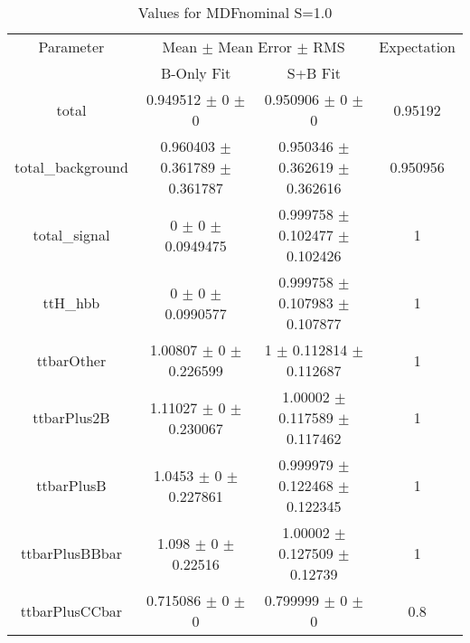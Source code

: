 \begin{table}
\centering
\caption{Values for MDFnominal S=1.0}
\begin{tabular}{cccc}
\toprule
Parameter & \multicolumn{2}{c}{Mean $\pm$ Mean Error $\pm$ RMS} & Expectation\\
 & B-Only Fit & S+B Fit & \\
\midrule
total & \num{0.949512} $\pm$ \num{0} $\pm$ \num{0} & \num{0.950906} $\pm$ \num{0} $\pm$ \num{0} & \num{0.95192}\\
total\_background & \num{0.960403} $\pm$ \num{0.361789} $\pm$ \num{0.361787} & \num{0.950346} $\pm$ \num{0.362619} $\pm$ \num{0.362616} & \num{0.950956}\\
total\_signal & \num{0} $\pm$ \num{0} $\pm$ \num{0.0949475} & \num{0.999758} $\pm$ \num{0.102477} $\pm$ \num{0.102426} & \num{1}\\
ttH\_hbb & \num{0} $\pm$ \num{0} $\pm$ \num{0.0990577} & \num{0.999758} $\pm$ \num{0.107983} $\pm$ \num{0.107877} & \num{1}\\
ttbarOther & \num{1.00807} $\pm$ \num{0} $\pm$ \num{0.226599} & \num{1} $\pm$ \num{0.112814} $\pm$ \num{0.112687} & \num{1}\\
ttbarPlus2B & \num{1.11027} $\pm$ \num{0} $\pm$ \num{0.230067} & \num{1.00002} $\pm$ \num{0.117589} $\pm$ \num{0.117462} & \num{1}\\
ttbarPlusB & \num{1.0453} $\pm$ \num{0} $\pm$ \num{0.227861} & \num{0.999979} $\pm$ \num{0.122468} $\pm$ \num{0.122345} & \num{1}\\
ttbarPlusBBbar & \num{1.098} $\pm$ \num{0} $\pm$ \num{0.22516} & \num{1.00002} $\pm$ \num{0.127509} $\pm$ \num{0.12739} & \num{1}\\
ttbarPlusCCbar & \num{0.715086} $\pm$ \num{0} $\pm$ \num{0} & \num{0.799999} $\pm$ \num{0} $\pm$ \num{0} & \num{0.8}\\
\bottomrule
\end{tabular}
\end{table}